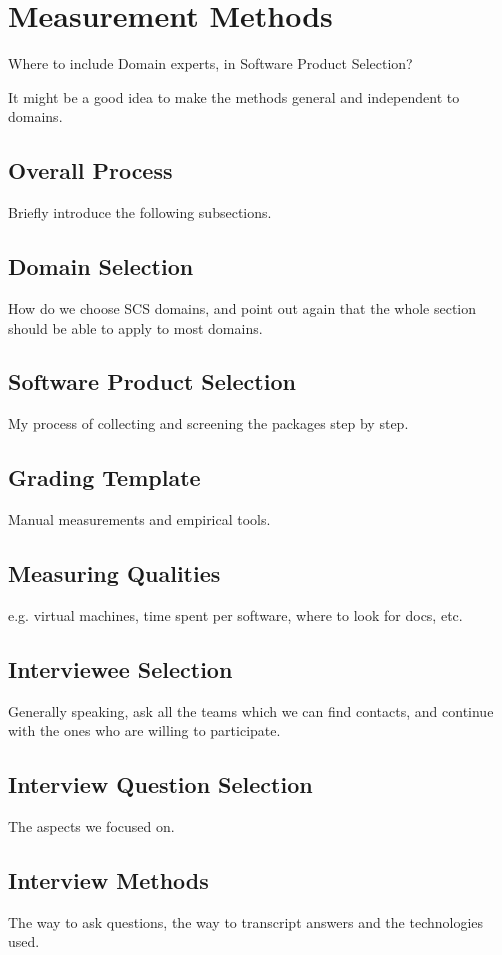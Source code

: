 \chapter{Measurement Methods}
\label{ch_methods}

Where to include Domain experts, in Software Product Selection?

It might be a good idea to make the methods general and independent to domains.

\section{Overall Process}

Briefly introduce the following subsections.

\section{Domain Selection}
How do we choose SCS domains, and point out again that the whole section should be able to apply to most domains.

\section{Software Product Selection}

My process of collecting and screening the packages step by step.

\section{Grading Template}

Manual measurements and empirical tools.

\section{Measuring Qualities}

e.g. virtual machines, time spent per software, where to look for docs, etc.

\section{Interviewee Selection}

Generally speaking, ask all the teams which we can find contacts, and continue with the ones who are willing to participate.

\section{Interview Question Selection}

The aspects we focused on.

\section{Interview Methods}

The way to ask questions, the way to transcript answers and the technologies used.
